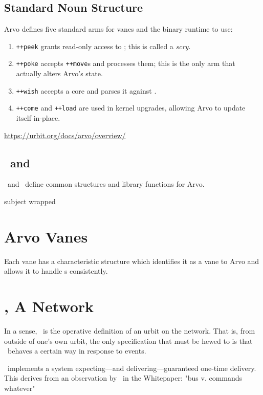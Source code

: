\subsection{Standard Noun Structure}

Arvo defines five standard arms for vanes and the binary runtime to use:

\begin{enumerate}
  \item  \texttt{++peek} grants read-only access to \clay; this is called a \emph{scry}.
  \item  \texttt{++poke} accepts \texttt{++move}s and processes them; this is the only arm that actually alters Arvo's state.
  \item  \texttt{++wish} accepts a core and parses it against \zuse.
  \item  \texttt{++come} and \texttt{++load} are used in kernel upgrades, allowing Arvo to update itself in-place.
\end{enumerate}


\href{Arvo tutorial}{https://urbit.org/docs/arvo/overview/}

\subsection[\zuse~\&~\lull]{\zuse~and \lull}

\zuse~and \lull~define common structures and library functions for Arvo.

subject wrapped

\section{Arvo Vanes}

Each vane has a characteristic structure which identifies it as a vane to Arvo and allows it to handle \move s consistently.

\section[\ames]{\ames, A Network}

In a sense, \ames~is the operative definition of an urbit on the network.  That is, from outside of one's own urbit, the only specification that must be hewed to is that \ames~behaves a certain way in response to events.

\ames~implements a system expecting—and delivering—guaranteed one-time delivery.  This derives from an observation by \citeauthor{Yarvin2016}~in the Whitepaper:  "bus v. commands whatever"

